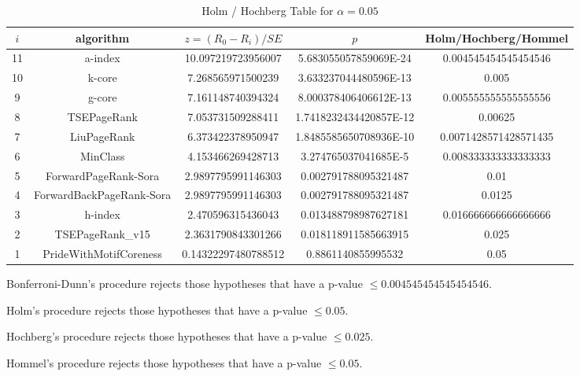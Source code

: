 \documentclass[a4paper,10pt]{article}
\begin{document}
\begin{landscape}
\begin{table}[!htp]
\centering\tiny
\caption{Holm / Hochberg Table for $\alpha=0.05$}
\begin{tabular}{ccccc}
$i$&algorithm&$z=(R_0 - R_i)/SE$&$p$&Holm/Hochberg/Hommel\\
\hline
11&a-index&10.097219723956007&5.683055057859069E-24&0.004545454545454546\\
10&k-core&7.268565971500239&3.633237044480596E-13&0.005\\
9&g-core&7.161148740394324&8.000378406406612E-13&0.005555555555555556\\
8&TSEPageRank&7.053731509288411&1.7418232434420857E-12&0.00625\\
7&LiuPageRank&6.373422378950947&1.8485585650708936E-10&0.0071428571428571435\\
6&MinClass&4.153466269428713&3.274765037041685E-5&0.008333333333333333\\
5&ForwardPageRank-Sora&2.9897795991146303&0.002791788095321487&0.01\\
4&ForwardBackPageRank-Sora&2.9897795991146303&0.002791788095321487&0.0125\\
3&h-index&2.470596315436043&0.013488798987627181&0.016666666666666666\\
2&TSEPageRank_v15&2.3631790843301266&0.018118911585663915&0.025\\
1&PrideWithMotifCoreness&0.14322297480788512&0.8861140855995532&0.05\\
\hline
\end{tabular}
\end{table}
Bonferroni-Dunn's procedure rejects those hypotheses that have a p-value $\le0.004545454545454546$.


Holm's procedure rejects those hypotheses that have a p-value $\le0.05$.


Hochberg's procedure rejects those hypotheses that have a p-value $\le0.025$.


Hommel's procedure rejects those hypotheses that have a p-value $\le0.05$.



\end{landscape}
\end{document}
